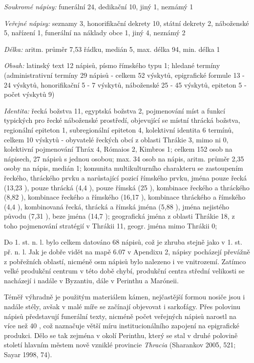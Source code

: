 {\em Soukromé nápisy:} funerální 24, dedikační 10, jiný 1, neznámý 1

{\em Veřejné nápisy:} seznamy 3, honorifikační dekrety 10, státní dekrety 2, náboženské 5, nařízení 1, funerální na náklady obce 1, jiný 4, neznámý 2

{\em Délka:} aritm. průměr 7,53 řádku, medián 5, max. délka 94, min. délka 1

{\em Obsah:} latinský text 12 nápisů, písmo římského typu 1; hledané termíny (administrativní termíny 29 nápisů - celkem 52 výskytů, epigrafické formule 13 - 24 výskytů, honorifikační 5 - 7 výskytů, náboženské 25 - 45 výskytů, epiteton 5 - počet výskytů 9)

{\em Identita:} řecká božstva 11, egyptská božstva 2, pojmenování míst a funkcí typických pro řecké náboženské prostředí, objevující se místní thrácká božstva, regionální epiteton 1, subregionální epiteton 4, kolektivní identita 6 termínů, celkem 10 výskytů - obyvatelé řeckých obcí z oblasti Thrákie 3, mimo ni 0, kolektivní pojmenování Thráx 4, Rómaios 2, Kimbros 1; celkem 152 osob na nápisech, 27 nápisů s jednou osobou; max. 34 osob na nápis, aritm. průměr 2,35 osoby na nápis, medián 1; komunita multikulturního charakteru se zastoupením řeckého, thráckého prvku a narůstající pozicí římského prvku, jména pouze řecká (13,23 ), pouze thrácká (4,4 ), pouze římská (25 ), kombinace řeckého a thráckého (8,82 ), kombinace řeckého a římského (16,17 ), kombinace thráckého a římského (4,4 ), kombinovaná řecká, thrácká a římská jména (5,88 ), jména nejistého původu (7,31 ), beze jména (14,7 ); geografická jména z oblasti Thrákie 18, z toho pojmenování stratégií v Thrákii 11, geogr. jména mimo Thrákii 0;

\NC\AR
\HL
\HL
\stoptable

Do 1. st. n. l. bylo celkem datováno 68 nápisů, což je zhruba stejně jako v 1. st. př. n. l. Jak je dobře vidět na mapě 6.07 v Apendixu 2, nápisy pocházejí převážně z pobřežních oblastí, nicméně osm nápisů bylo nalezeno i ve vnitrozemí. Zatímco velké produkční centrum v této době chybí, produkční centra střední velikosti se nacházejí i nadále v Byzantiu, dále v Perinthu a Maróneii.

Téměř výhradně je použitým materiálem kámen, nejčastější formou nosiče jsou i nadále stély, avšak v malé míře se začínají objevovat i sarkofágy. Přes polovinu nápisů představují funerální texty, nicméně počet veřejných nápisů narostl na více než 40 , což naznačuje větší míru institucionálního zapojení na epigrafické produkci. Dělo se tak zejména v okolí Perinthu, který se stal v druhé polovině století hlavním městem nově vzniklé provincie {\em Thracia} (Sharankov 2005, 521; Sayar 1998, 74).


